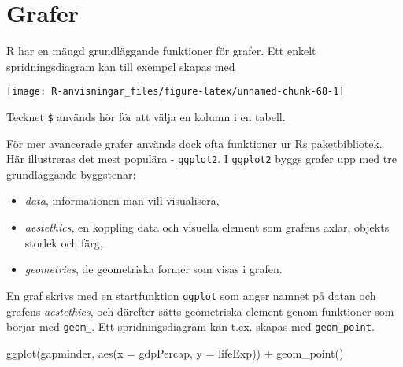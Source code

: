\documentclass[
]{book}
\newenvironment{Shaded}{\begin{snugshade}}{\end{snugshade}}
\newcommand{\AttributeTok}[1]{\textcolor[rgb]{0.77,0.63,0.00}{#1}}
\newcommand{\FunctionTok}[1]{\textcolor[rgb]{0.00,0.00,0.00}{#1}}
\newcommand{\NormalTok}[1]{#1}
\newcommand{\SpecialCharTok}[1]{\textcolor[rgb]{0.00,0.00,0.00}{#1}}
\providecommand{\tightlist}{%
  \setlength{\itemsep}{0pt}\setlength{\parskip}{0pt}}
\theoremstyle{definition}
\theoremstyle{definition}
\theoremstyle{definition}
\theoremstyle{definition}
\theoremstyle{remark}
\begin{document}
\hypertarget{grafer}{%
\section{Grafer}\label{grafer}}

R har en mängd grundläggande funktioner för grafer. Ett enkelt spridningsdiagram kan till exempel skapas med

\begin{Shaded}
\end{Shaded}

\begin{center}\texttt{[image: R-anvisningar\_files/figure-latex/unnamed-chunk-68-1]} \end{center}

Tecknet \texttt{\$} används hör för att välja en kolumn i en tabell.

För mer avancerade grafer används dock ofta funktioner ur Rs paketbibliotek. Här illustreras det mest populära - \texttt{ggplot2}. I \texttt{ggplot2} byggs grafer upp med tre grundläggande byggstenar:

\begin{itemize}
\tightlist
\item
  \emph{data}, informationen man vill visualisera,
\item
  \emph{aestethics}, en koppling data och visuella element som grafens axlar, objekts storlek och färg,
\item
  \emph{geometries}, de geometriska former som visas i grafen.
\end{itemize}

En graf skrivs med en startfunktion \texttt{ggplot} som anger namnet på datan och grafens \emph{aestethics}, och därefter sätts geometriska element genom funktioner som börjar med \texttt{geom\_}. Ett spridningsdiagram kan t.ex. skapas med \texttt{geom\_point}.

\begin{Shaded}
\begin{Highlighting}[]
\FunctionTok{ggplot}\NormalTok{(gapminder, }\FunctionTok{aes}\NormalTok{(}\AttributeTok{x =}\NormalTok{ gdpPercap, }\AttributeTok{y =}\NormalTok{ lifeExp)) }\SpecialCharTok{+}
  \FunctionTok{geom\_point}\NormalTok{()}
\end{Highlighting}
\end{Shaded}
\end{document}
